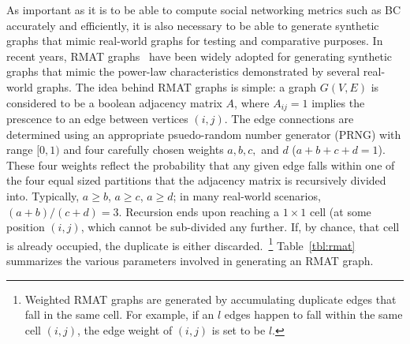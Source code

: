 %
As important as it is to be able to compute social networking metrics such as
BC accurately and efficiently, it is also necessary to be able to generate
synthetic graphs that mimic real-world graphs for testing and comparative
purposes.
%
In recent years, RMAT graphs~\cite{Chakrabarti04:Recursive} have been widely
adopted for generating synthetic graphs that mimic the power-law
characteristics demonstrated by several real-world graphs.
%
The idea behind RMAT graphs is simple: a graph $G(V,E)$ is considered to be 
a boolean adjacency matrix $A$, where $A_{ij}=1$ implies the prescence to an 
edge between vertices $(i,j)$.
%
The edge connections are determined using an appropriate psuedo-random number 
generator (PRNG) with range $[0,1)$ and four carefully chosen weights $a,b,c,$
and $d$ ($a+b+c+d=1$).
%
These four weights reflect the probability that any given edge falls within one
of the four equal sized partitions that the adjacency matrix is recursively
divided into.
%
Typically, $a\ge{}b$, $a\ge{}c$, $a\ge{}d$; in many real-world scenarios,
$(a+b)/(c+d)=3$.
%
Recursion ends upon reaching a $1\times{}1$ cell (at some position $(i,j)$,
which cannot be sub-divided any further.
%
If, by chance, that cell is already occupied, the duplicate is either
discarded.~\footnote{Weighted RMAT graphs are generated by accumulating
duplicate edges that fall in the same cell. For example, if an $l$ edges happen
to fall within the same cell $(i,j)$, the edge weight of $(i,j)$ is set to be
$l$.}
%
Table~\ref{tbl:rmat} summarizes the various parameters involved in generating 
an RMAT graph.
